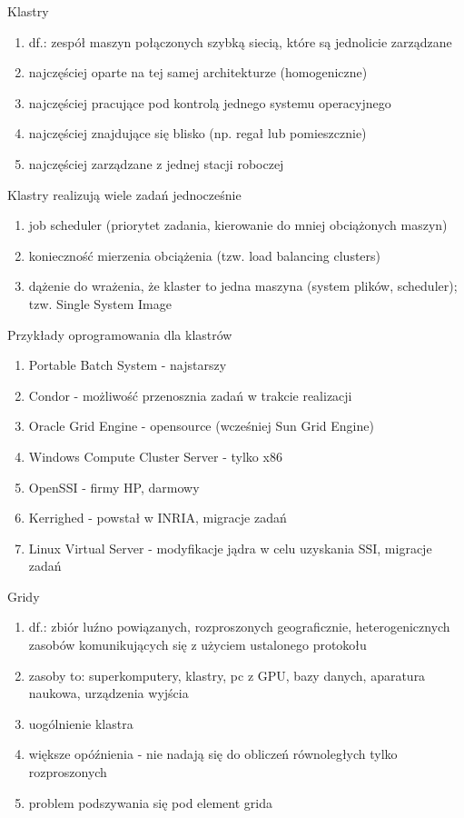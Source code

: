 \documentclass{beamer}
\begin{document}
\begin{frame}{Klastry}
  \begin{enumerate}
  \item df.: zespół maszyn połączonych szybką siecią, które są jednolicie zarządzane
  \item najczęściej oparte na tej samej architekturze (homogeniczne)
  \item najczęściej pracujące pod kontrolą jednego systemu operacyjnego
  \item najczęściej znajdujące się blisko (np. regał lub pomieszcznie)
  \item najczęściej zarządzane z jednej stacji roboczej
  \end{enumerate}
\end{frame}

\begin{frame}{Klastry realizują wiele zadań jednocześnie}
  \begin{enumerate}
  \item job scheduler (priorytet zadania, kierowanie do mniej obciążonych maszyn)
  \item konieczność mierzenia obciążenia (tzw. load balancing clusters)
  \item dążenie do wrażenia, że klaster to jedna maszyna (system plików, scheduler); tzw. Single System Image
  \end{enumerate}
\end{frame}

\begin{frame}{Przykłady oprogramowania dla klastrów}
  \begin{enumerate}
  \item Portable Batch System - najstarszy
  \item Condor - możliwość przenosznia zadań w trakcie realizacji
  \item Oracle Grid Engine - opensource (wcześniej Sun Grid Engine)
  \item Windows Compute Cluster Server - tylko x86
  \item OpenSSI - firmy HP, darmowy
  \item Kerrighed - powstał w INRIA, migracje zadań
  \item Linux Virtual Server - modyfikacje jądra w celu uzyskania SSI, migracje zadań
  \end{enumerate}
\end{frame}

\begin{frame}{Gridy}
  \begin{enumerate}
  \item df.: zbiór luźno powiązanych, rozproszonych geograficznie, heterogenicznych zasobów komunikujących się z użyciem ustalonego protokołu
  \item zasoby to: superkomputery, klastry, pc z GPU, bazy danych, aparatura naukowa, urządzenia wyjścia
  \item uogólnienie klastra
  \item większe opóźnienia - nie nadają się do obliczeń równoległych tylko rozproszonych
  \item problem podszywania się pod element grida
  \end{enumerate}
\end{frame}
\end{document}
